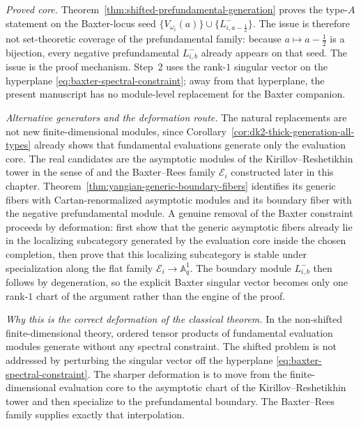\begin{remark}
\label{rem:mc3-baxter-constraint-removal}
\smallskip\noindent\emph{Proved core.}
Theorem~\ref{thm:shifted-prefundamental-generation} proves the
type-$A$ statement on the Baxter-locus seed
$\{V_{\omega_i}(a)\}\cup\{L^-_{i,a-\frac{1}{2}}\}$.
The issue is therefore not set-theoretic coverage of the
prefundamental family: because $a \mapsto a-\tfrac{1}{2}$ is a
bijection, every negative prefundamental $L^-_{i,b}$ already appears
on that seed. The issue is the proof mechanism. Step~2 uses the
rank-$1$ singular vector on the hyperplane
\eqref{eq:baxter-spectral-constraint}; away from that hyperplane, the
present manuscript has no module-level replacement for the Baxter
companion.

\smallskip\noindent\emph{Alternative generators and the deformation
route.}
The natural replacements are not new finite-dimensional modules, since
Corollary~\ref{cor:dk2-thick-generation-all-types} already shows that
fundamental evaluations generate only the evaluation core. The real
candidates are the asymptotic modules of the Kirillov--Reshetikhin
tower in the sense of \cite{HJZ25,Zhang24} and the Baxter--Rees family
$\mathcal{E}_i$ constructed later in this chapter.
Theorem~\ref{thm:yangian-generic-boundary-fibers} identifies its
generic fibers with Cartan-renormalized asymptotic modules and its
boundary fiber with the negative prefundamental module. A genuine
removal of the Baxter constraint proceeds by
deformation: first show that the generic asymptotic fibers already lie
in the localizing subcategory generated by the evaluation core inside
the chosen completion, then prove that this localizing subcategory is
stable under specialization along the flat family
$\mathcal{E}_i \to \mathbb{A}^1_q$. The boundary module $L^-_{i,b}$
then follows by degeneration, so the explicit Baxter singular
vector becomes only one rank-$1$ chart of the argument rather than the
engine of the proof.

\smallskip\noindent\emph{Why this is the correct deformation of the
classical theorem.}
In the non-shifted finite-dimensional theory, ordered tensor products
of fundamental evaluation modules generate without any spectral
constraint. The shifted problem is not addressed by perturbing the
singular vector off the hyperplane
\eqref{eq:baxter-spectral-constraint}. The sharper deformation is to
move from the finite-dimensional evaluation core to the asymptotic
chart of the Kirillov--Reshetikhin tower and then specialize to the
prefundamental boundary. The Baxter--Rees family supplies exactly that
interpolation.


\end{remark}
